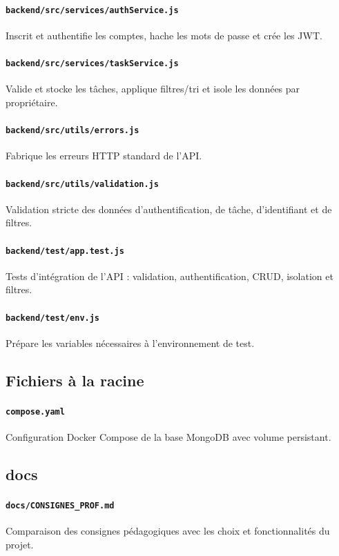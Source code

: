 \documentclass[10pt,a4paper]{article}
\begin{document}
\paragraph{\texttt{backend/src/services/authService.js}} Inscrit et authentifie les comptes, hache les mots de passe et crée les JWT.
\paragraph{\texttt{backend/src/services/taskService.js}} Valide et stocke les tâches, applique filtres/tri et isole les données par propriétaire.
\paragraph{\texttt{backend/src/utils/errors.js}} Fabrique les erreurs HTTP standard de l'API.
\paragraph{\texttt{backend/src/utils/validation.js}} Validation stricte des données d'authentification, de tâche, d'identifiant et de filtres.
\paragraph{\texttt{backend/test/app.test.js}} Tests d'intégration de l'API : validation, authentification, CRUD, isolation et filtres.
\paragraph{\texttt{backend/test/env.js}} Prépare les variables nécessaires à l'environnement de test.
\subsection*{Fichiers à la racine}
\paragraph{\texttt{compose.yaml}} Configuration Docker Compose de la base MongoDB avec volume persistant.
\subsection*{docs}
\paragraph{\texttt{docs/CONSIGNES\_PROF.md}} Comparaison des consignes pédagogiques avec les choix et fonctionnalités du projet.
\end{document}
